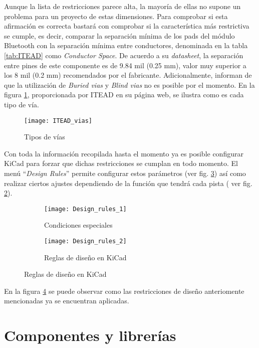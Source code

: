 Aunque la lista de restricciones parece alta, la mayoría de ellas no supone un problema para un proyecto de estas dimensiones. Para comprobar si esta afirmación es correcta bastará con comprobar si la característica más restrictiva se cumple, es decir, comparar la separación mínima de los pads del módulo Bluetooth con la separación mínima entre conductores, denominada en la tabla \ref{tab:ITEAD} como \textit{Conductor Space}. De acuerdo a su \textit{datasheet}, la separación entre pines de este componente es de 9.84 mil (0.25 mm), valor muy superior a los 8 mil (0.2 mm) recomendados por el fabricante.
\clearpage
Adicionalmente, informan de que la utilización de \textit{Buried vias} y \textit{Blind vias} no es posible por el momento. En la figura \ref{fig:ITEAD_vias}, proporcionada por ITEAD en su página web, se ilustra como es cada tipo de vía.

\begin{figure} [h]
    \centering
    \texttt{[image: ITEAD\_vias]}
    \caption{Tipos de vías}
    \label{fig:ITEAD_vias}
\end{figure}

Con toda la información recopilada hasta el momento ya es posible configurar KiCad para forzar que dichas restricciones se cumplan en todo momento. El menú ``\textit{Design Rules}'' permite configurar estos parámetros (ver fig. \ref{fig:Design_rules_general}) así como realizar ciertos ajustes dependiendo de la función que tendrá cada pista ( ver fig. \ref{fig:Design_rules_especial}).

\begin{figure}[h]
  \begin{subfigure}[b]{8cm}
   	\centering
    \texttt{[image: Design\_rules\_1]}
    \caption{Condiciones especiales}
    \label{fig:Design_rules_especial}
  \end{subfigure}
  \hfill
  \begin{subfigure}[b]{8cm}
  	\centering
    \texttt{[image: Design\_rules\_2]}
    \caption{Reglas de diseño en KiCad}
    \label{fig:Design_rules_general}
  \end{subfigure}
  \caption{Reglas de diseño en KiCad}
  \label{fig:Design_rules}
\end{figure}

 En la figura \ref{fig:Design_rules} se puede observar como las restricciones de diseño anteriomente mencionadas ya se encuentran aplicadas.

\clearpage

\section{Componentes y librerías\label{sec:Componentes_y_librerias}}

